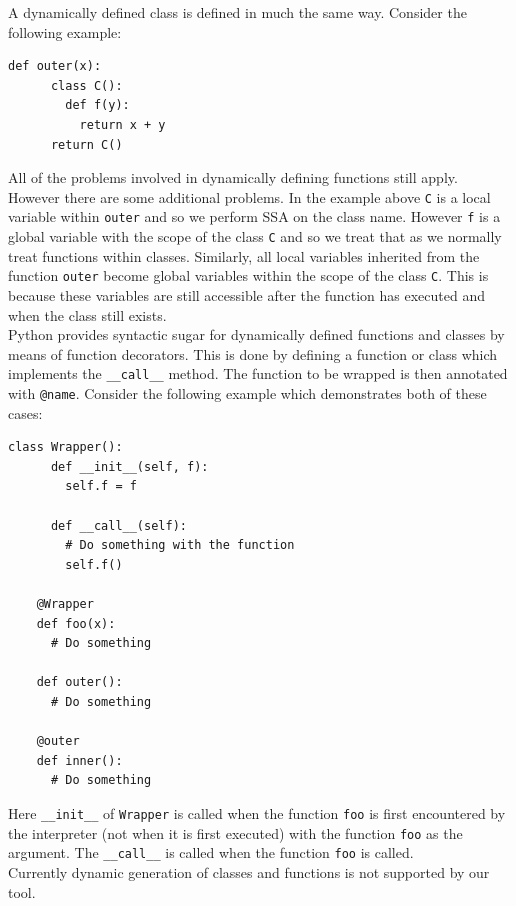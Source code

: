 \documentclass[12pt, titlepage]{article}
\begin{document}
\indent A dynamically defined class is defined in much the same way. Consider the following example:
\begin{lstlisting}[mathescape]
    def outer(x):
      class C():
        def f(y):
          return x + y
      return C()
\end{lstlisting}
All of the problems involved in dynamically defining functions still apply. However there are some additional problems. In the example above \texttt{C} is a local variable within \texttt{outer} and so we perform SSA on the class name. However \texttt{f} is a global variable with the scope of the class \texttt{C} and so we treat that as we normally treat functions within classes. Similarly, all local variables inherited from the function \texttt{outer} become global variables within the scope of the class \texttt{C}. This is because these variables are still accessible after the function has executed and when the class still exists. \\
\indent Python provides syntactic sugar for dynamically defined functions and classes by means of function decorators. This is done by defining a function or class which implements the \texttt{\_\_call\_\_} method. The function to be wrapped is then annotated with \texttt{@name}. Consider the following example which demonstrates both of these cases:
\begin{lstlisting}[mathescape]
    class Wrapper():
      def __init__(self, f):
        self.f = f
        
      def __call__(self):
        # Do something with the function
        self.f()

    @Wrapper
    def foo(x):
      # Do something
      
    def outer():
      # Do something
     
    @outer
    def inner():
      # Do something
\end{lstlisting}
Here \texttt{\_\_init\_\_} of \texttt{Wrapper} is called when the function \texttt{foo} is first encountered by the interpreter (not when it is first executed) with the function \texttt{foo} as the argument. The \texttt{\_\_call\_\_} is called when the function \texttt{foo} is called. \\
\indent Currently dynamic generation of classes and functions is not supported by our tool.
\end{document}
